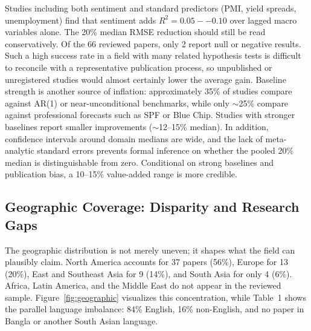 \documentclass[12pt,oneside]{article}
\begin{document}
Studies including both sentiment and standard predictors (PMI, yield spreads, unemployment) find that sentiment adds $R^2 = 0.05--0.10$ over lagged macro variables alone. The 20\% median RMSE reduction should still be read conservatively. Of the 66 reviewed papers, only 2 report null or negative results. Such a high success rate in a field with many related hypothesis tests is difficult to reconcile with a representative publication process, so unpublished or unregistered studies would almost certainly lower the average gain. Baseline strength is another source of inflation: approximately 35\% of studies compare against AR(1) or near-unconditional benchmarks, while only $\sim$25\% compare against professional forecasts such as SPF or Blue Chip. Studies with stronger baselines report smaller improvements ($\sim$12--15\% median). In addition, confidence intervals around domain medians are wide, and the lack of meta-analytic standard errors prevents formal inference on whether the pooled 20\% median is distinguishable from zero. Conditional on strong baselines and publication bias, a 10--15\% value-added range is more credible.

\subsection{Geographic Coverage: Disparity and Research Gaps}

The geographic distribution is not merely uneven; it shapes what the field can plausibly claim. North America accounts for 37 papers (56\%), Europe for 13 (20\%), East and Southeast Asia for 9 (14\%), and South Asia for only 4 (6\%). Africa, Latin America, and the Middle East do not appear in the reviewed sample. Figure~\ref{fig:geographic} visualizes this concentration, while Table~1 shows the parallel language imbalance: 84\% English, 16\% non-English, and no paper in Bangla or another South Asian language.
\end{document}
